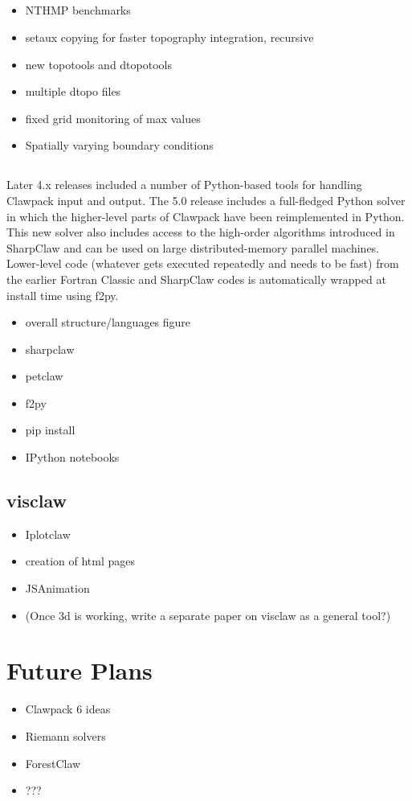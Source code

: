 \documentclass[]{siamltex}
\begin{document}
\subsection{\geoclaw}
\begin{itemize}
    \item NTHMP benchmarks
    \item setaux copying for faster topography integration, recursive 
    \item new topotools and dtopotools
    \item multiple dtopo files
    \item fixed grid monitoring of max values
    \item Spatially varying boundary conditions
\end{itemize}
    
\subsection{\pyclaw}

Later 4.x releases included a number of Python-based tools for handling Clawpack input and output.  The 5.0 release includes a full-fledged Python solver in which the higher-level parts of Clawpack have been reimplemented in Python.  This new solver also includes access to the high-order algorithms introduced in SharpClaw and can be used on large distributed-memory parallel machines.  Lower-level code (whatever gets executed repeatedly and needs to be fast) from the earlier Fortran Classic and SharpClaw codes is automatically wrapped at install time using f2py.

\begin{itemize}
    \item overall structure/languages figure
    \item sharpclaw
    \item petclaw
    \item f2py
    \item pip install
    \item IPython notebooks
\end{itemize}
    
\subsection{visclaw}
\begin{itemize}
    \item Iplotclaw
    \item creation of html pages
    \item JSAnimation
    \item (Once 3d is working, write a separate paper on visclaw as a general tool?)
\end{itemize}

\section{Future Plans}
\begin{itemize}
    \item Clawpack 6 ideas
    \item Riemann solvers
    \item ForestClaw
    \item ???
\end{itemize}
\end{document}
